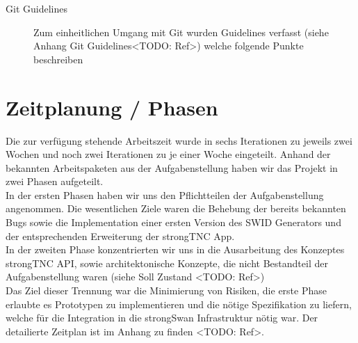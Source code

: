 \begin{description}
	\item[Git Guidelines] Zum einheitlichen Umgang mit Git wurden Guidelines
	verfasst (siehe Anhang Git Guidelines<TODO: Ref>) welche folgende Punkte
	beschreiben

\end{description}


\section{Zeitplanung / Phasen}
Die zur verfügung stehende Arbeitszeit wurde in sechs Iterationen zu jeweils
zwei Wochen und noch zwei Iterationen zu je einer Woche eingeteilt. Anhand der
bekannten Arbeitspaketen aus der Aufgabenstellung haben wir das Projekt in zwei
Phasen aufgeteilt.\\
In der ersten Phasen haben wir uns den Pflichtteilen der Aufgabenstellung
angenommen. Die wesentlichen Ziele waren die Behebung der bereits bekannten Bugs
sowie die Implementation einer ersten Version des SWID Generators und der
entsprechenden Erweiterung der strongTNC App. \\
In der zweiten Phase konzentrierten wir uns in die Ausarbeitung des Konzeptes
strongTNC API, sowie architektonische Konzepte, die nicht Bestandteil der
Aufgabenstellung waren (siehe Soll Zustand <TODO: Ref>)\\
Das Ziel dieser Trennung war die Minimierung von Risiken, die erste Phase
erlaubte es Prototypen zu implementieren und die nötige Spezifikation zu
liefern, welche für die Integration in die strongSwan Infrastruktur nötig war.
Der detailierte Zeitplan ist im Anhang zu finden <TODO: Ref>.
